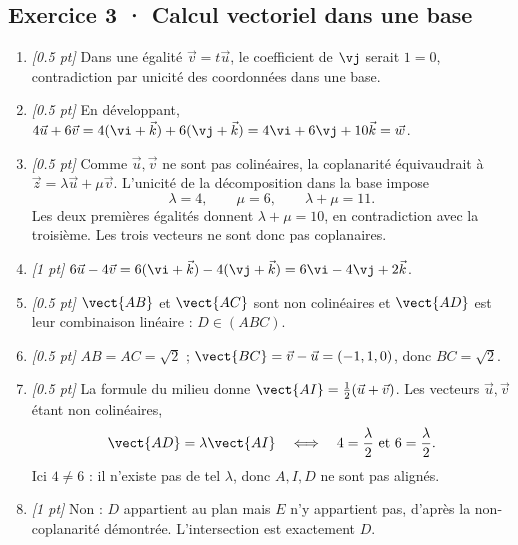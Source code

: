 \subsection*{Exercice 3 · Calcul vectoriel dans une base}\begin{enumerate}

\item \textit{[\num{0,5} pt]} Dans une égalité $\vec v=t\vec u$, le coefficient de $\vj $ serait $1=0$, contradiction par unicité des coordonnées dans une base.

\item \textit{[\num{0,5} pt]} En développant, $4\vec u+6\vec v=4(\vi +\vec k)+6(\vj +\vec k)=4\vi +6\vj +10\vec k=\vec w$.

\item \textit{[\num{0,5} pt]} Comme $\vec u,\vec v$ ne sont pas colinéaires, la coplanarité équivaudrait à $\vec z=\lambda\vec u+\mu\vec v$. L'unicité de la décomposition dans la base impose
\[\lambda=4,\qquad\mu=6,\qquad\lambda+\mu=11.\]
Les deux premières égalités donnent $\lambda+\mu=10$, en contradiction avec la troisième. Les trois vecteurs ne sont donc pas coplanaires.

\item \textit{[1 pt]} $6\vec u-4\vec v=6(\vi +\vec k)-4(\vj +\vec k)=6\vi -4\vj +2\vec k$.

\item \textit{[\num{0,5} pt]} $\vect{AB}$ et $\vect{AC}$ sont non colinéaires et $\vect{AD}$ est leur combinaison linéaire : $D\in(ABC)$.

\item \textit{[\num{0,5} pt]} $AB=AC=\sqrt2$ ; $\vect{BC}=\vec v-\vec u=(-1,1,0)$, donc $BC=\sqrt2$.

\item \textit{[\num{0,5} pt]} La formule du milieu donne $\vect{AI}=\frac12(\vec u+\vec v)$. Les vecteurs $\vec u,\vec v$ étant non colinéaires,
\[\vect{AD}=\lambda\vect{AI}\quad\Longleftrightarrow\quad 4=\frac{\lambda}{2}\ \text{et}\ 6=\frac{\lambda}{2}.\]
Ici $4\ne 6$ : il n'existe pas de tel $\lambda$, donc $A,I,D$ ne sont pas alignés.

\item \textit{[1 pt]} Non : $D$ appartient au plan mais $E$ n'y appartient pas, d'après la non-coplanarité démontrée. L'intersection est exactement $D$.

\end{enumerate}

